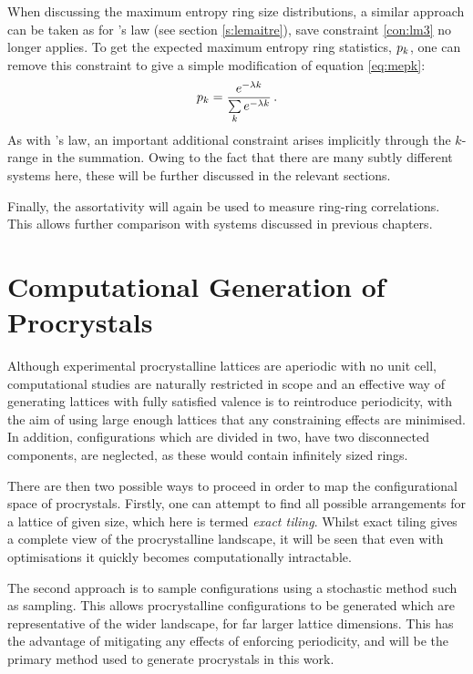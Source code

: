 When discussing the maximum entropy ring size distributions, a similar approach can be taken as for \lm's law (see section \ref{s:lemaitre}), save constraint \eqref{con:lm3} no longer applies.
To get the expected maximum entropy ring statistics, $p_k$, one can remove this constraint to give a simple modification of equation \eqref{eq:mepk}:
\begin{equation}
	\label{eq:prome}
    p_k = \frac{e^{-\lambda k}}{\sum\limits_k e^{-\lambda k}}\,.
\end{equation}
As with \lm's law, an important additional constraint arises implicitly through the $k$\--range in the summation.
Owing to the fact that there are many subtly different systems here, these will be further discussed in the relevant sections.

Finally, the assortativity will again be used to measure ring\--ring correlations.
This allows further comparison with systems discussed in previous chapters.

\section{Computational Generation of Procrystals}

Although experimental procrystalline lattices are aperiodic with no unit cell, computational studies are naturally restricted in scope and an effective way of generating lattices with fully satisfied valence is to reintroduce periodicity, with the aim of using large enough lattices that any constraining effects are minimised. 
In addition, configurations which are divided in two, \ie{} have two disconnected components, are neglected, as these would contain infinitely sized rings.

There are then two possible ways to proceed in order to map the configurational space of procrystals.
Firstly, one can attempt to find all possible arrangements for a lattice of given size, which here is termed \textit{exact tiling}.
Whilst exact tiling gives a complete view of the procrystalline landscape, it will be seen that even with optimisations it quickly becomes computationally intractable.

The second approach is to sample configurations using a stochastic method such as \mc{} sampling.
This allows procrystalline configurations to be generated which are representative of the wider landscape, for far larger lattice dimensions.
This has the advantage of mitigating any effects of enforcing periodicity, and will be the primary method used to generate procrystals in this work.

